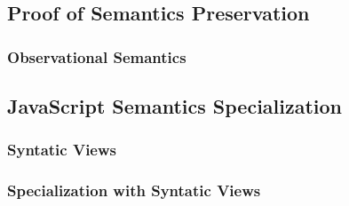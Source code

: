 \subsection{Proof of Semantics Preservation}

\todo

\subsubsection{Observational Semantics}

\todo





\subsection{JavaScript Semantics Specialization}

\todo

\subsubsection{Syntatic Views}

\todo

\subsubsection{Specialization with Syntatic Views}

\todo
